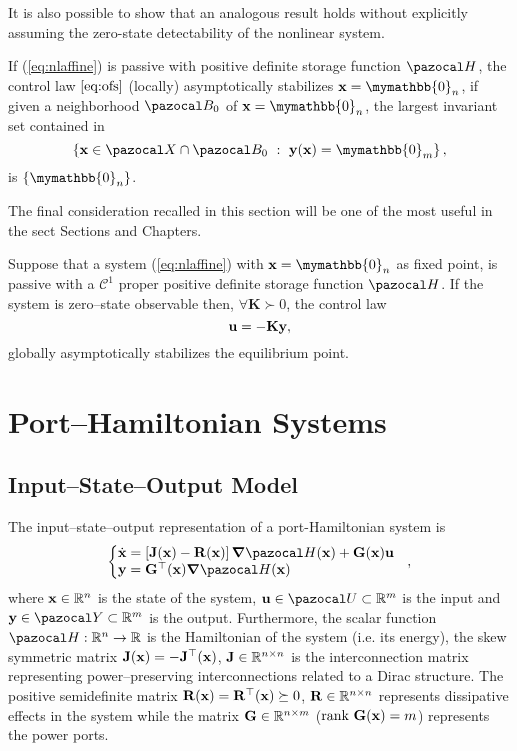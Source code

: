 %
It is also possible to show that an analogous result holds without explicitly assuming the zero-state detectability of the nonlinear system.
\begin{prop}
	If (\ref{eq:nlaffine}) is passive with positive definite storage function $\Ha$, the control law $\ref{eq:ofs}$ (locally) asymptotically stabilizes $\xb=\mymathbb{0}_n$, if given a neighborhood $\B_0$ of $\x=\mymathbb{0}_n$, the largest invariant set contained in
	\begin{equation}
		\left\{\xb\in\X\cap\B_0~:~\yb(\xb)=\mymathbb{0}_m\right\},
	\end{equation}
	is $\{\mymathbb{0}_n\}$.
\end{prop}
%
The final consideration recalled in this section will be one of the most useful in the sect Sections and Chapters.
%
\begin{cor}\label{th:ofgs}
	Suppose that a system (\ref{eq:nlaffine}) with $\xb=\mymathbb{0}_n$ as fixed point, is passive with a $\mathcal{C}^1$ proper positive definite storage function $\Ha$. If the system is zero--state observable then, $\forall\mathbf{K}\succ 0$, the control law
	\begin{equation}
	    \mathbf{u}=-\mathbf{K}\mathbf{y},
	\end{equation}
	globally asymptotically stabilizes the equilibrium point.
\end{cor}
%
\clearpage
\section{Port--Hamiltonian Systems\label{sec:PH_systems}}
%
%
\subsection{Input--State--Output Model}
%
The input--state--output representation of a port-Hamiltonian system is
%
\begin{equation}\label{eq:PHsys}
	\left\{
	    \begin{matrix*}[l]
	        \dot{\xb} = \left[\mathbf{J}(\xb) - \mathbf{R}(\xb)\right]\bm{\nabla}\Ha(\xb) + \mathbf{G}(\xb)\mathbf{u}\\
	        \mathbf{y} = \mathbf{G}^\top(\xb)\bm{\nabla}\Ha(\xb) 
	    \end{matrix*}
	\right.~~,
\end{equation}
%
where $\mathbf{x}\in\mathbb{R}^n$ is the state of the system, $\ub\in\U\subset\R^m$ is the input and $\yb\in\Y\subset\R^m$ is the output.
Furthermore, the scalar function $\Ha:\R^n\rightarrow\R$ is the Hamiltonian of the system (i.e. its energy), the skew symmetric matrix $\mathbf{J}(\mathbf{x}) = -\mathbf{J}^\top(\mathbf{x})$, $\mathbf{J}\in\mathbb{R}^{n\times n}$ is the interconnection matrix representing power--preserving interconnections related to a Dirac structure. The positive semidefinite matrix $\mathbf{R}(\mathbf{x}) = \mathbf{R}^\top(\mathbf{x})\succeq 0$, $\mathbf{R}\in\mathbb{R}^{n\times n}$ represents dissipative effects in the system while the matrix $\mathbf{G}\in\mathbb{R}^{n\times m}$ ($\text{rank}~ \mathbf{G}(\mathbf{x}) = m$) represents the power ports.
%
\newline

